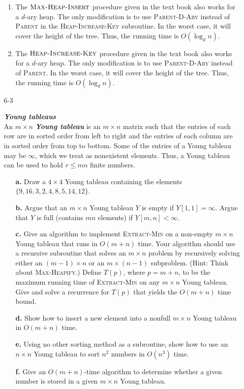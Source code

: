 \begin{enumerate}
\begin{framed}
\begin{enumerate}
\item The $\textsc{Max-Heap-Insert}$ procedure given in the text book also works
for a $d$-ary heap. The only modification is to use \textsc{Parent-D-Ary}
instead of \textsc{Parent} in the \textsc{Heap-Increase-Key} subroutine. In the
worst case, it will cover the height of the tree. Thus, the running time is
$O(\log_d n)$.

\item The $\textsc{Heap-Increase-Key}$ procedure given in the text book also
works for a $d$-ary heap. The only modification is to use \textsc{Parent-D-Ary}
instead of \textsc{Parent}. In the worst case, it will cover the height of the
tree. Thus, the running time is $O(\log_d n)$.
\end{enumerate}
\end{framed}

\newpage

\item[6{-}3]{\textbf{\emph{Young tableaus}}\\
An $m \times n$ \textbf{\emph{Young tableau}} is an $m \times n$ matrix such
that the entries of each row are in sorted order from left to right and the
entries of each column are in sorted order from top to bottom. Some of the
entries of a Young tableau may be $\infty$, which we treat as nonexistent
elements. Thus, a Young tableau can be used to hold $r \le mn$ finite numbers.
\begin{enumerate}
\item[\textbf{a.}] Draw a $4 \times 4$ Young tableau containing the elements
$\{9, 16, 3, 2, 4, 8, 5, 14, 12\}$.
\item[\textbf{b.}] Argue that an $m \times n$ Young tableau $Y$ is empty if
$Y[1, 1] = \infty$. Argue that $Y$ is full (contains $mn$ elements) if
$Y[m, n] < \infty$.
\item[\textbf{c.}] Give an algorithm to implement \textsc{Extract-Min} on
a non-empty $m \times n$ Young tableau that runs in $O(m + n)$ time. Your
algorithm should use a recursive subroutine that solves an $m \times n$ problem
by recursively solving either an $(m - 1) \times n$ or an $m \times (n - 1)$
subproblem. (Hint: Think about \textsc{Max-Heapify}.) Define $T(p)$, where
$p = m + n$, to be the maximum running time of \textsc{Extract-Min} on any
$m \times n$ Young tableau. Give and solve a recurrence for $T(p)$ that yields
the $O(m + n)$ time bound.
\item[\textbf{d.}] Show how to insert a new element into a nonfull $m \times n$
Young tableau in $O(m + n)$ time.
\item[\textbf{e.}] Using no other sorting method as a subroutine, show how to
use an $n \times n$ Young tableau to sort $n^2$ numbers in $O(n^3)$ time.
\item[\textbf{f.}] Give an $O(m + n)$-time algorithm to determine whether
a given number is stored in a given $m \times n$ Young tableau.
\end{enumerate}
}


\end{enumerate}

